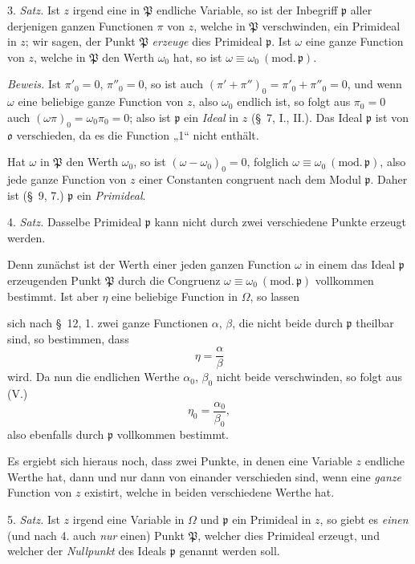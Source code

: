 \documentclass{article}
\begin{document}
3. \emph{Satz.} Ist $z$ irgend eine in $\mathfrak{P}$ endliche Variable, so ist der Inbegriff $\mathfrak{p}$ aller derjenigen ganzen Functionen $\pi$ von $z$, welche in $\mathfrak{P}$ verschwinden, ein Primideal in $z$; wir sagen, der Punkt $\mathfrak{P}$ \emph{erzeuge} dies Primideal $\mathfrak{p}$. Ist $\omega$ eine ganze Function von $z$, welche in $\mathfrak{P}$ den Werth $\omega_{0}$ hat, so ist $\omega \equiv \omega_{0} \ (\text{mod.}\,\mathfrak{p})$.

\emph{Beweis.} Ist $\pi'_{0} = 0$, $\pi''_{0} = 0$, so ist auch $(\pi' + \pi'')_{0} = \pi'_{0} + \pi''_{0} = 0$, und wenn $\omega$ eine beliebige ganze Function von $z$, also $\omega_{0}$ endlich ist, so folgt aus $\pi_{0} = 0$ auch $(\omega\pi)_{0} = \omega_{0}\pi_{0} = 0$; also ist $\mathfrak{p}$ ein \emph{Ideal} in $z$ (§~7, I., II.). Das Ideal $\mathfrak{p}$ ist von $\mathfrak{o}$ verschieden, da es die Function „1“ nicht enthält.

Hat $\omega$ in $\mathfrak{P}$ den Werth $\omega_{0}$, so ist $(\omega - \omega_{0})_{0} = 0$, folglich $\omega \equiv \omega_{0} \ (\text{mod.}\,\mathfrak{p})$, also jede ganze Function von $z$ einer Constanten congruent nach dem Modul $\mathfrak{p}$. Daher ist (§~9, 7.) $\mathfrak{p}$ ein \emph{Primideal}.

4. \emph{Satz.} Dasselbe Primideal $\mathfrak{p}$ kann nicht durch zwei verschiedene Punkte erzeugt werden.

Denn zunächst ist der Werth einer jeden ganzen Function $\omega$ in einem das Ideal $\mathfrak{p}$ erzeugenden Punkt $\mathfrak{P}$ durch die Congruenz $\omega \equiv \omega_{0} \ (\text{mod.}\,\mathfrak{p})$ vollkommen bestimmt. Ist aber $\eta$ eine beliebige Function in $\Omega$, so lassen

sich nach §~12, 1. zwei ganze Functionen $\alpha$, $\beta$, die nicht beide durch $\mathfrak{p}$ theilbar sind, so bestimmen, dass
\[ \eta = \frac{\alpha}{\beta} \]
wird. Da nun die endlichen Werthe $\alpha_{0}$, $\beta_{0}$ nicht beide verschwinden, so folgt aus (V.)
\[ \eta_{0} = \frac{\alpha_{0}}{\beta_{0}}, \]
also ebenfalls durch $\mathfrak{p}$ vollkommen bestimmt.

Es ergiebt sich hieraus noch, dass zwei Punkte, in denen eine Variable $z$ endliche Werthe hat, dann und nur dann von einander verschieden sind, wenn eine \emph{ganze} Function von $z$ existirt, welche in beiden verschiedene Werthe hat.

5. \emph{Satz.} Ist $z$ irgend eine Variable in $\Omega$ und $\mathfrak{p}$ ein Primideal in $z$, so giebt es \emph{einen} (und nach 4. auch \emph{nur} einen) Punkt $\mathfrak{P}$, welcher dies Primideal erzeugt, und welcher der \emph{Nullpunkt} des Ideals $\mathfrak{p}$ genannt werden soll.
\end{document}
